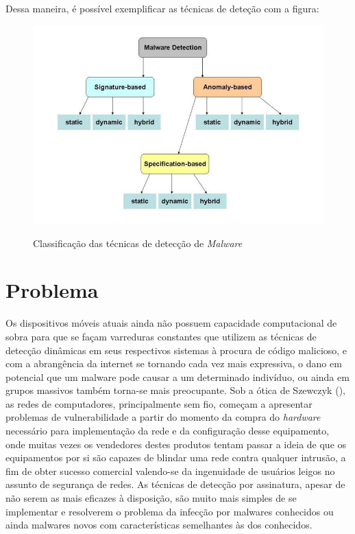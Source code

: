 Dessa maneira, é possível exemplificar as técnicas de deteção com a figura:

\begin{figure}[H]
\caption{\small Classificação das técnicas de detecção de \textit{Malware}}
\centering
\includegraphics[scale=0.8]{figs/fig1}
\label{f.metodos_deteccao_01}
\end{figure}

\chapter{Problema}
\label{c.problema}

Os dispositivos móveis atuais ainda não possuem capacidade computacional de
sobra para que se façam varreduras constantes que utilizem as técnicas de
detecção dinâmicas em seus respectivos sistemas à procura de código malicioso,
e com a abrangência da internet se tornando cada vez mais expressiva, o dano
em potencial que um malware pode causar a um determinado indivíduo, ou ainda
em grupos massivos também torna-se mais preocupante. Sob a ótica de Szewczyk
(\citeyear{szewczyk12}), as redes de computadores, principalmente sem fio, começam a apresentar
problemas de vulnerabilidade a partir do momento da compra do \textit{hardware}
necessário para implementação da rede e da configuração desse equipamento,
onde muitas vezes os vendedores destes produtos tentam passar a ideia de que
os equipamentos por si são capazes de blindar uma rede contra qualquer
intrusão, a fim de obter sucesso comercial valendo-se da ingenuidade de
usuários leigos no assunto de segurança de redes. As técnicas de detecção por
assinatura, apesar de não serem as mais eficazes à disposição, são muito mais
simples de se implementar e resolverem o problema da infecção por malwares
conhecidos ou ainda malwares novos com características semelhantes às dos
conhecidos.




